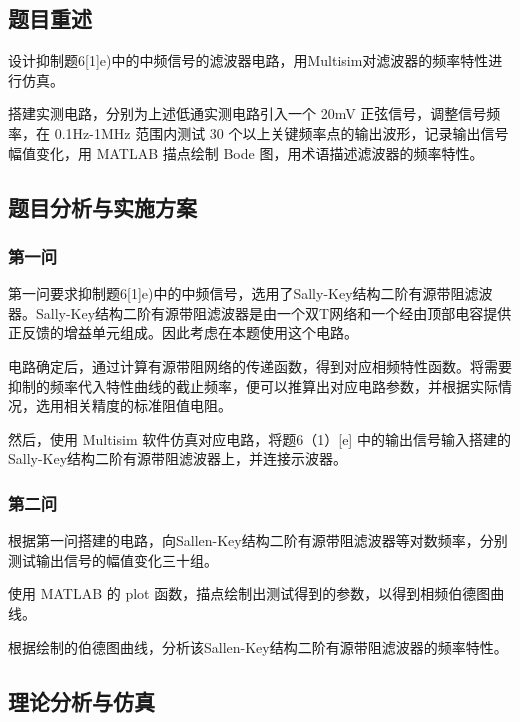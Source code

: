 \documentclass[./测控三级项目.tex]{subfiles} %
\begin{document}
	\subsection{题目重述}
		\begin{compactenum}
			\item 设计抑制题6[1]e)中的中频信号的滤波器电路，用Multisim对滤波器的频率特性进行仿真。
			\item 搭建实测电路，分别为上述低通实测电路引入一个 20mV 正弦信号，调整信号频率，在 0.1Hz-1MHz 范围内测试 30 个以上关键频率点的输出波形，记录输出信号幅值变化，用 MATLAB 描点绘制 Bode 图，用术语描述滤波器的频率特性。
		\end{compactenum}
	\subsection{题目分析与实施方案}
		\subsubsection{第一问}
			第一问要求抑制题6[1]e)中的中频信号，选用了Sally-Key结构二阶有源带阻滤波器。Sally-Key结构二阶有源带阻滤波器是由一个双T网络和一个经由顶部电容提供正反馈的增益单元组成。因此考虑在本题使用这个电路。 \par
			电路确定后，通过计算有源带阻网络的传递函数，得到对应相频特性函数。将需要抑制的频率代入特性曲线的截止频率，便可以推算出对应电路参数，并根据实际情况，选用相关精度的标准阻值电阻。 \par
			然后，使用 Multisim 软件仿真对应电路，将题6（1）[e] 中的输出信号输入搭建的Sally-Key结构二阶有源带阻滤波器上，并连接示波器。
		\subsubsection{第二问}
			根据第一问搭建的电路，向Sallen-Key结构二阶有源带阻滤波器等对数频率，分别测试输出信号的幅值变化三十组。\par 
		使用 MATLAB 的 plot 函数，描点绘制出测试得到的参数，以得到相频伯德图曲线。\par 
		根据绘制的伯德图曲线，分析该Sallen-Key结构二阶有源带阻滤波器的频率特性。
	\subsection{理论分析与仿真}
\end{document}
